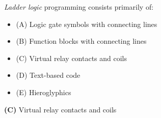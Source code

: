 

{\it Ladder logic} programming consists primarily of:

\begin{itemize}
\item{(A)} Logic gate symbols with connecting lines
\vskip 5pt 
\item{(B)} Function blocks with connecting lines
\vskip 5pt 
\item{(C)} Virtual relay contacts and coils
\vskip 5pt 
\item{(D)} Text-based code
\vskip 5pt 
\item{(E)} Hieroglyphics
\end{itemize}







{\bf (C)} Virtual relay contacts and coils
 










